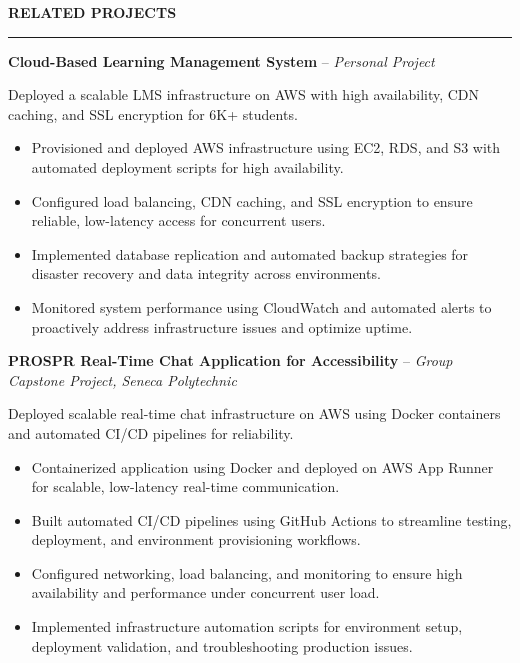 \documentclass[10pt,letterpaper]{article}
\begin{document}
\vspace{6pt}

\textbf{RELATED PROJECTS}\\[-8pt]
\noindent\rule{\textwidth}{1pt}

\vspace{-2pt}

\textbf{Cloud-Based Learning Management System} -- \emph{Personal Project}

\vspace{-1pt}

Deployed a scalable LMS infrastructure on AWS with high availability, CDN caching, and SSL encryption for 6K+ students.
\vspace{-1pt}
\begin{itemize}
\item Provisioned and deployed AWS infrastructure using EC2, RDS, and S3 with automated deployment scripts for high availability.
\item Configured load balancing, CDN caching, and SSL encryption to ensure reliable, low-latency access for concurrent users.
\item Implemented database replication and automated backup strategies for disaster recovery and data integrity across environments.
\item Monitored system performance using CloudWatch and automated alerts to proactively address infrastructure issues and optimize uptime.
\end{itemize}

\textbf{PROSPR  Real-Time Chat Application for Accessibility} -- \emph{Group Capstone Project, Seneca Polytechnic}

\vspace{-1pt}

Deployed scalable real-time chat infrastructure on AWS using Docker containers and automated CI/CD pipelines for reliability.
\vspace{-1pt}
\begin{itemize}
\item Containerized application using Docker and deployed on AWS App Runner for scalable, low-latency real-time communication.
\item Built automated CI/CD pipelines using GitHub Actions to streamline testing, deployment, and environment provisioning workflows.
\item Configured networking, load balancing, and monitoring to ensure high availability and performance under concurrent user load.
\item Implemented infrastructure automation scripts for environment setup, deployment validation, and troubleshooting production issues.
\end{itemize}
\end{document}
